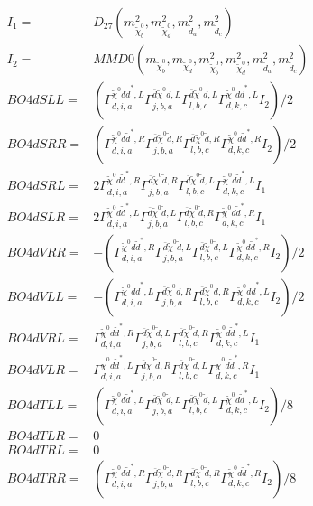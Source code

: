 \documentclass[A4,landscape]{article}
\begin{document}
\begin{align} 
I_1 = & D_{27}(m^2_{\tilde{\chi}^0_{{b}}}, m^2_{\tilde{\chi}^0_{{d}}}, m^2_{\tilde{d}_{{a}}}, m^2_{\tilde{d}_{{c}}}) \\ 
I_2 = & MMD0(m_{\tilde{\chi}^0_{{b}}}, m_{\tilde{\chi}^0_{{d}}}, m^2_{\tilde{\chi}^0_{{b}}}, m^2_{\tilde{\chi}^0_{{d}}}, m^2_{\tilde{d}_{{a}}}, m^2_{\tilde{d}_{{c}}}) \\ 
  BO4dSLL= & ( \Gamma^{\tilde{\chi}^0 d \tilde{d}^*,L}_{d, i, a} \Gamma^{\bar{d}\tilde{\chi}^0 \tilde{d} ,L}_{j, b, a} \Gamma^{\bar{d}\tilde{\chi}^0 \tilde{d} ,L}_{l, b, c} \Gamma^{\tilde{\chi}^0 d \tilde{d}^*,L}_{d, k, c} I_2)/2 \\ 
  BO4dSRR= & ( \Gamma^{\tilde{\chi}^0 d \tilde{d}^*,R}_{d, i, a} \Gamma^{\bar{d}\tilde{\chi}^0 \tilde{d} ,R}_{j, b, a} \Gamma^{\bar{d}\tilde{\chi}^0 \tilde{d} ,R}_{l, b, c} \Gamma^{\tilde{\chi}^0 d \tilde{d}^*,R}_{d, k, c} I_2)/2 \\ 
  BO4dSRL= & 2  \Gamma^{\tilde{\chi}^0 d \tilde{d}^*,R}_{d, i, a} \Gamma^{\bar{d}\tilde{\chi}^0 \tilde{d} ,R}_{j, b, a} \Gamma^{\bar{d}\tilde{\chi}^0 \tilde{d} ,L}_{l, b, c} \Gamma^{\tilde{\chi}^0 d \tilde{d}^*,L}_{d, k, c} I_1 \\ 
  BO4dSLR= & 2  \Gamma^{\tilde{\chi}^0 d \tilde{d}^*,L}_{d, i, a} \Gamma^{\bar{d}\tilde{\chi}^0 \tilde{d} ,L}_{j, b, a} \Gamma^{\bar{d}\tilde{\chi}^0 \tilde{d} ,R}_{l, b, c} \Gamma^{\tilde{\chi}^0 d \tilde{d}^*,R}_{d, k, c} I_1 \\ 
  BO4dVRR= & -( \Gamma^{\tilde{\chi}^0 d \tilde{d}^*,R}_{d, i, a} \Gamma^{\bar{d}\tilde{\chi}^0 \tilde{d} ,L}_{j, b, a} \Gamma^{\bar{d}\tilde{\chi}^0 \tilde{d} ,L}_{l, b, c} \Gamma^{\tilde{\chi}^0 d \tilde{d}^*,R}_{d, k, c} I_2)/2 \\ 
  BO4dVLL= & -( \Gamma^{\tilde{\chi}^0 d \tilde{d}^*,L}_{d, i, a} \Gamma^{\bar{d}\tilde{\chi}^0 \tilde{d} ,R}_{j, b, a} \Gamma^{\bar{d}\tilde{\chi}^0 \tilde{d} ,R}_{l, b, c} \Gamma^{\tilde{\chi}^0 d \tilde{d}^*,L}_{d, k, c} I_2)/2 \\ 
  BO4dVRL= &  \Gamma^{\tilde{\chi}^0 d \tilde{d}^*,R}_{d, i, a} \Gamma^{\bar{d}\tilde{\chi}^0 \tilde{d} ,L}_{j, b, a} \Gamma^{\bar{d}\tilde{\chi}^0 \tilde{d} ,R}_{l, b, c} \Gamma^{\tilde{\chi}^0 d \tilde{d}^*,L}_{d, k, c} I_1 \\ 
  BO4dVLR= &  \Gamma^{\tilde{\chi}^0 d \tilde{d}^*,L}_{d, i, a} \Gamma^{\bar{d}\tilde{\chi}^0 \tilde{d} ,R}_{j, b, a} \Gamma^{\bar{d}\tilde{\chi}^0 \tilde{d} ,L}_{l, b, c} \Gamma^{\tilde{\chi}^0 d \tilde{d}^*,R}_{d, k, c} I_1 \\ 
  BO4dTLL= & ( \Gamma^{\tilde{\chi}^0 d \tilde{d}^*,L}_{d, i, a} \Gamma^{\bar{d}\tilde{\chi}^0 \tilde{d} ,L}_{j, b, a} \Gamma^{\bar{d}\tilde{\chi}^0 \tilde{d} ,L}_{l, b, c} \Gamma^{\tilde{\chi}^0 d \tilde{d}^*,L}_{d, k, c} I_2)/8 \\ 
  BO4dTLR= & 0 \\ 
  BO4dTRL= & 0 \\ 
  BO4dTRR= & ( \Gamma^{\tilde{\chi}^0 d \tilde{d}^*,R}_{d, i, a} \Gamma^{\bar{d}\tilde{\chi}^0 \tilde{d} ,R}_{j, b, a} \Gamma^{\bar{d}\tilde{\chi}^0 \tilde{d} ,R}_{l, b, c} \Gamma^{\tilde{\chi}^0 d \tilde{d}^*,R}_{d, k, c} I_2)/8 \\ 
\end{align} 
\end{document}
